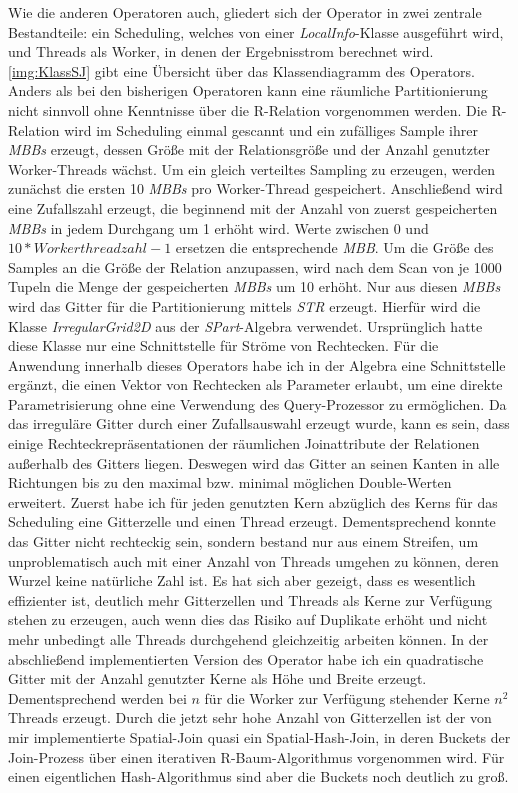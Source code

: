 \documentclass[a4paper,12pt,twoside]{article}
\newcommand{\Fb}[1]{\textit{#1}} %
\begin{document}
Wie die anderen Operatoren auch, gliedert sich der Operator in zwei zentrale Bestandteile: ein Scheduling, welches von einer \Fb{LocalInfo}-Klasse ausgeführt wird, und Threads als Worker, in denen der Ergebnisstrom berechnet wird. \autoref{img:KlassSJ} gibt eine Übersicht über das Klassendiagramm des Operators. Anders als bei den bisherigen Operatoren kann eine räumliche Partitionierung nicht sinnvoll ohne Kenntnisse über die R-Relation vorgenommen werden. Die R-Relation wird im Scheduling einmal gescannt und ein zufälliges Sample ihrer \Fb{MBBs} erzeugt, dessen Größe mit der Relationsgröße und der Anzahl genutzter Worker-Threads wächst. Um ein gleich verteiltes Sampling zu erzeugen, werden zunächst die ersten 10 \Fb{MBBs} pro Worker-Thread gespeichert. Anschließend wird eine Zufallszahl erzeugt, die beginnend mit der Anzahl von zuerst gespeicherten \Fb{MBBs} in jedem Durchgang um 1 erhöht wird. Werte zwischen 0 und $10 * Workerthreadzahl - 1$ ersetzen die entsprechende \Fb{MBB}. Um die Größe des Samples an die Größe der Relation anzupassen, wird nach dem Scan von je 1000 Tupeln die Menge der gespeicherten \Fb{MBBs} um 10 erhöht. Nur aus diesen \Fb{MBBs} wird das Gitter für die Partitionierung mittels \Fb{STR} erzeugt. Hierfür wird die Klasse \Fb{IrregularGrid2D} aus der \Fb{SPart}-Algebra verwendet. Ursprünglich hatte diese Klasse nur eine Schnittstelle für Ströme von Rechtecken. Für die Anwendung innerhalb dieses Operators habe ich in der Algebra eine Schnittstelle ergänzt, die einen Vektor von Rechtecken als Parameter erlaubt, um eine direkte Parametrisierung ohne eine Verwendung des Query-Prozessor zu ermöglichen. Da das irreguläre Gitter durch einer Zufallsauswahl erzeugt wurde, kann es sein, dass einige Rechteckrepräsentationen der räumlichen Joinattribute der Relationen außerhalb des Gitters liegen. Deswegen wird das Gitter an seinen Kanten in alle Richtungen bis zu den maximal bzw. minimal möglichen Double-Werten erweitert. Zuerst habe ich für jeden genutzten Kern abzüglich des Kerns für das Scheduling eine Gitterzelle und einen Thread erzeugt. Dementsprechend konnte das Gitter nicht rechteckig sein, sondern bestand nur aus einem Streifen, um unproblematisch auch mit einer Anzahl von Threads umgehen zu können, deren Wurzel keine natürliche Zahl ist. Es hat sich aber gezeigt, dass es wesentlich effizienter ist, deutlich mehr Gitterzellen und Threads als Kerne zur Verfügung stehen zu erzeugen, auch wenn dies das Risiko auf Duplikate erhöht und nicht mehr unbedingt alle Threads durchgehend gleichzeitig arbeiten können. In der abschließend implementierten Version des Operator habe ich ein quadratische Gitter mit der Anzahl genutzter Kerne als Höhe und Breite erzeugt. Dementsprechend werden bei $n$ für die Worker zur Verfügung stehender Kerne $n^2$ Threads erzeugt. Durch die jetzt sehr hohe Anzahl von Gitterzellen ist der von mir implementierte Spatial-Join quasi ein Spatial-Hash-Join, in deren Buckets der Join-Prozess über einen iterativen R-Baum-Algorithmus vorgenommen wird. Für einen eigentlichen  Hash-Algorithmus sind aber die Buckets noch deutlich zu groß.
\end{document}

